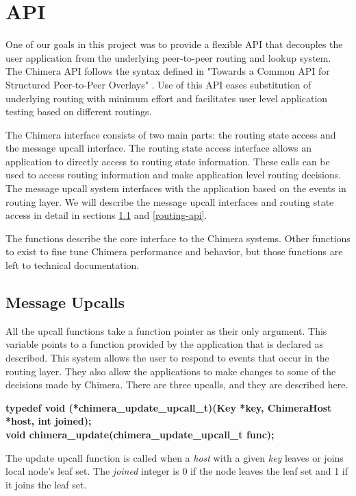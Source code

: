 \section{API}
\label{api}

One of our goals in this project was to provide a flexible API that
decouples the user application from the underlying peer-to-peer routing
and lookup system. The Chimera API follows the syntax defined in "Towards
a Common API for Structured Peer-to-Peer Overlays" \cite{commonapi}. Use of this
API eases substitution of underlying routing with minimum effort and
facilitates user level application testing based on different routings.

The Chimera interface consists of two main parts: the routing state access
and the message upcall interface. The routing state access interface allows
an application to directly access to routing state information. These calls
can be used to access routing information and make application level routing
decisions. The message
upcall system interfaces with the application based on the
events in routing layer. We will describe 
the message upcall interfaces and routing state access 
in detail in sections \ref{upcall-api} and
\ref{routing-api}.

The functions describe the core interface to the Chimera systems. Other
functions to exist to fine tune Chimera performance and behavior, but
those functions are left to technical documentation.

\subsection{Message Upcalls}
\label{upcall-api}

All the upcall functions take a function pointer as their only
argument. This variable points to a function provided by the application
that is declared as described. This system allows the user to respond
to events that occur in the routing layer. They also allow the applications
to make changes to some of the decisions made by Chimera. There are three
upcalls, and they are described here.

{\noindent \bf typedef void (*chimera\_update\_upcall\_t)(Key *key, ChimeraHost *host, int joined);}\\
{\noindent \bf void chimera\_update(chimera\_update\_upcall\_t func);}

The update upcall function is called when a {\em host} with a given
{\em key} leaves or joins local node's leaf set. The {\em joined} integer
is 0 if the node leaves the leaf set and 1 if it joins the leaf set.

